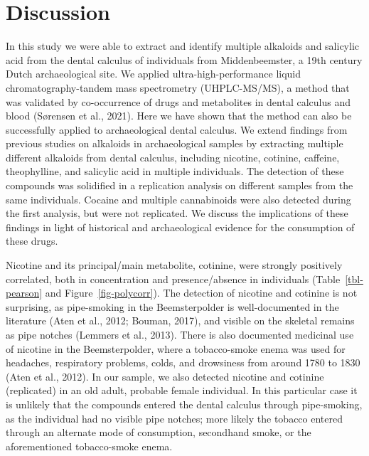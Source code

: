 \documentclass[
  letterpaper,
]{book}
\begin{document}
\hypertarget{discussion-1}{%
\section{Discussion}\label{discussion-1}}

In this study we were able to extract and identify multiple alkaloids
and salicylic acid from the dental calculus of individuals from
Middenbeemster, a 19th century Dutch archaeological site. We applied
ultra-high-performance liquid chromatography-tandem mass spectrometry
(UHPLC-MS/MS), a method that was validated by co-occurrence of drugs and
metabolites in dental calculus and blood (Sørensen et al., 2021). Here
we have shown that the method can also be successfully applied to
archaeological dental calculus. We extend findings from previous studies
on alkaloids in archaeological samples by extracting multiple different
alkaloids from dental calculus, including nicotine, cotinine, caffeine,
theophylline, and salicylic acid in multiple individuals. The detection
of these compounds was solidified in a replication analysis on different
samples from the same individuals. Cocaine and multiple cannabinoids
were also detected during the first analysis, but were not replicated.
We discuss the implications of these findings in light of historical and
archaeological evidence for the consumption of these drugs.

Nicotine and its principal/main metabolite, cotinine, were strongly
positively correlated, both in concentration and presence/absence in
individuals (Table~\ref{tbl-pearson} and Figure~\ref{fig-polycorr}). The
detection of nicotine and cotinine is not surprising, as pipe-smoking in
the Beemsterpolder is well-documented in the literature (Aten et al.,
2012; Bouman, 2017), and visible on the skeletal remains as pipe notches
(Lemmers et al., 2013). There is also documented medicinal use of
nicotine in the Beemsterpolder, where a tobacco-smoke enema was used for
headaches, respiratory problems, colds, and drowsiness from around 1780
to 1830 (Aten et al., 2012). In our sample, we also detected nicotine
and cotinine (replicated) in an old adult, probable female individual.
In this particular case it is unlikely that the compounds entered the
dental calculus through pipe-smoking, as the individual had no visible
pipe notches; more likely the tobacco entered through an alternate mode
of consumption, secondhand smoke, or the aforementioned tobacco-smoke
enema.
\end{document}
